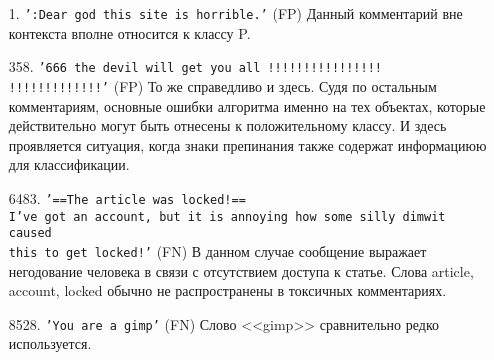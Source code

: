 \documentclass[12pt]{article}
\begin{document}
\begin{itemize}
    \item[1.] \texttt{':Dear god this site is horrible.'} (FP) Данный комментарий вне контекста вполне относится к классу P.
    \item[358.] \texttt{'666 the devil will get you all !!!!!!!!!!!!!!!!\\ !!!!!!!!!!!!!'} (FP) То же справедливо и здесь. Судя по остальным комментариям, основные ошибки алгоритма именно на тех объектах, которые действительно могут быть отнесены к положительному классу. И здесь проявляется ситуация, когда знаки препинания также содержат информациюю для классификации.
    \item[6483.] \texttt{'==The article was locked!==\\ I've got an account, but it is annoying how some silly dimwit caused\\ this to get locked!'} (FN) В данном случае сообщение выражает негодование человека в связи с отсутствием доступа к статье. Слова article, account, locked обычно не распространены в токсичных комментариях.
    \item[8528.] \texttt{'You are  a gimp'} (FN) Слово <<gimp>> сравнительно редко используется.
\end{itemize}
\newpage
\printbibliography
\end{document}
